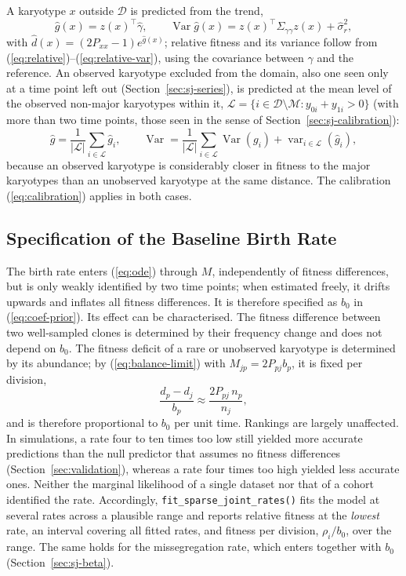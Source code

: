 \documentclass[11pt]{article}
\begin{document}
A karyotype $x$ outside $\mathcal{D}$ is predicted from the trend,
\begin{equation}
  \hat g(x)=z(x)^\top\hat\gamma,\qquad
  \operatorname{Var}\hat g(x)=z(x)^\top\Sigma_{\gamma\gamma}z(x)+\hat\sigma_r^2,
  \label{eq:predict-trend}
\end{equation}
with $\hat d(x)=(2P_{xx}-1)e^{\hat g(x)}$; relative fitness and its variance
follow from (\ref{eq:relative})--(\ref{eq:relative-var}), using the covariance
between $\gamma$ and the reference. An observed karyotype excluded from the
domain, also one seen only at a time point left out
(Section~\ref{sec:sj-series}), is predicted at the mean level of the observed non-major karyotypes
within it, $\mathcal{L}=\{i\in\mathcal{D}\setminus\mathcal{M}:y_{0i}+y_{1i}>0\}$
(with more than two time points, those seen in the sense of
Section~\ref{sec:sj-calibration}):
\begin{equation}
  \hat g=\frac{1}{|\mathcal{L}|}\sum_{i\in\mathcal{L}}\hat g_i,\qquad
  \operatorname{Var}=\frac{1}{|\mathcal{L}|}\sum_{i\in\mathcal{L}}\operatorname{Var}(g_i)
  +\operatorname{var}_{i\in\mathcal{L}}(\hat g_i),
  \label{eq:predict-level}
\end{equation}
because an observed karyotype is considerably closer in fitness to the major
karyotypes than an unobserved karyotype at the same distance. The calibration
(\ref{eq:calibration}) applies in both cases.

\subsection{Specification of the Baseline Birth Rate}
\label{sec:sj-rate}

The birth rate enters (\ref{eq:ode}) through $M$, independently of fitness
differences, but is only weakly identified by two time points; when estimated
freely, it drifts upwards and inflates all fitness differences. It is
therefore specified as $b_0$ in (\ref{eq:coef-prior}). Its effect can be
characterised. The fitness difference between two well-sampled clones is
determined by their frequency change and does not depend on $b_0$. The
fitness deficit of a rare or unobserved karyotype is determined by its
abundance; by (\ref{eq:balance-limit}) with $M_{jp}=2P_{pj}b_p$, it is fixed
per division,
\begin{equation}
  \frac{d_p-d_j}{b_p}\approx\frac{2P_{pj}\,n_p}{n_j},
  \label{eq:per-division}
\end{equation}
and is therefore proportional to $b_0$ per unit time. Rankings are largely
unaffected. In simulations, a rate four to ten times too low still yielded
more accurate predictions than the null predictor that assumes no fitness
differences (Section~\ref{sec:validation}), whereas a rate four times too high
yielded less accurate ones. Neither the marginal
likelihood of a single dataset nor that of a cohort identified the rate.
Accordingly, \texttt{fit\_sparse\_joint\_rates()} fits the model at several
rates across a plausible range and reports relative fitness at the
\emph{lowest} rate, an interval covering all fitted rates, and fitness per
division, $\rho_i/b_0$, over the range. The same holds for the
missegregation rate, which enters together with $b_0$
(Section~\ref{sec:sj-beta}).
\end{document}
